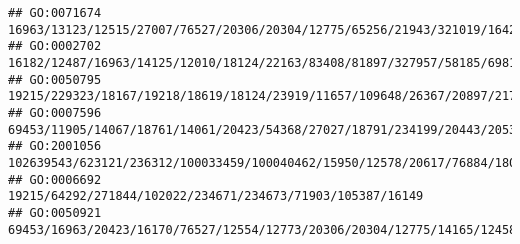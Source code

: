 \documentclass[
]{article}
\begin{document}
\begin{verbatim}
## GO:0071674                                                                                                                                                                                                                                                                                                16963/13123/12515/27007/76527/20306/20304/12775/65256/21943/321019/16421/11815/245195/71223/12458/11629/12766
## GO:0002702                                                                                                                                                                                                                                                                                                                         16182/12487/16963/14125/12010/18124/22163/83408/81897/327957/58185/69816/16149/12229
## GO:0050795                                                                                                                                                                                                                                                                                                                                   19215/229323/18167/19218/18619/18124/23919/11657/109648/26367/20897/217369
## GO:0007596                                                                                                                                                                                                                                                                                                         69453/11905/14067/18761/14061/20423/54368/27027/18791/234199/20443/20533/71753/15160/100503895/11551
## GO:2001056                                                                                                                                                                                                                                                                                                                  102639543/623121/236312/100033459/100040462/15950/12578/20617/76884/18053/18095/54483/19876
## GO:0006692                                                                                                                                                                                                                                                                                                                                                   19215/64292/271844/102022/234671/234673/71903/105387/16149
## GO:0050921                                                                                                                                                                                                                                                                                                                    69453/16963/20423/16170/76527/12554/12773/20306/20304/12775/14165/12458/11629/16149/12766

\end{verbatim}
\end{document}
